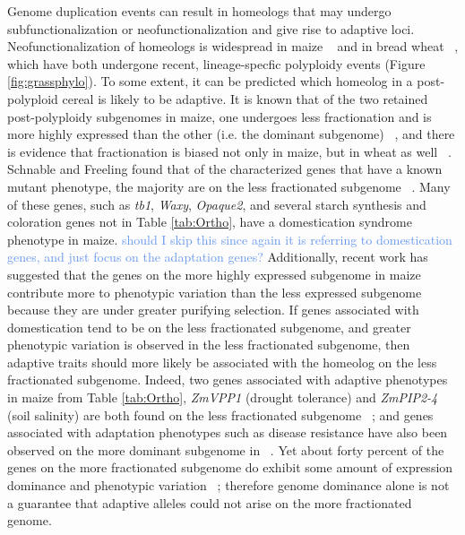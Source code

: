 \documentclass[12pt]{article}
\newcommand{\mbh}[1]{\textcolor{red}{\normalsize  #1}}
\newcommand{\mw}[1]{\textcolor{cornflowerblue}{\normalsize #1}}
\begin{document}

Genome duplication events can result in homeologs that may undergo subfunctionalization or neofunctionalization and give rise to adaptive loci. Neofunctionalization of homeologs is widespread in maize ~\citep{Hughes2014} and in bread wheat ~\citep{Pfeifer2014}, which have both undergone recent, lineage-specfic polyploidy events (Figure \ref{fig:grassphylo}).
To some extent, it can be predicted which homeolog in a post-polyploid cereal is likely to be adaptive.
It is known that of the two retained post-polyploidy subgenomes in maize, one undergoes less fractionation and is more highly expressed than the other (i.e. the dominant subgenome) ~\citep{Woodhouse2010, Schnable2011}, and there is evidence that fractionation is biased not only in maize, but in wheat as well ~\citep{Eckardt2014}.
Schnable and Freeling found that of the characterized genes that have a known mutant phenotype, the majority are on the less fractionated subgenome ~\citep{Schnable20112}.
Many of these genes, such as \textit{tb1}, \textit{Waxy}, \textit{Opaque2}, and several starch synthesis and coloration genes not in Table \ref{tab:Ortho}, have a domestication syndrome phenotype in maize. \mw{should I skip this since again it is referring to domestication genes, and just focus on the adaptation genes?}
Additionally, recent work has suggested that the genes on the more highly expressed subgenome in maize contribute more to phenotypic variation than the less expressed subgenome ~\citep{RennyByfield2017} because they are under greater purifying selection.
If genes associated with domestication tend to be on the less fractionated subgenome, and greater phenotypic variation is observed in the less fractionated subgenome, then adaptive traits should more likely be associated with the homeolog on the less fractionated subgenome.
Indeed, two genes associated with adaptive phenotypes in maize from Table \ref{tab:Ortho}, \textit{ZmVPP1} (drought tolerance) and \textit{ZmPIP2-4} (soil salinity) are both found on the less fractionated subgenome ~\citep{Schnable20112}; and genes associated with adaptation phenotypes such as disease resistance have also been observed on the more dominant subgenome in ~\citep{RennyByfield2017}. 
Yet about forty percent of the genes on the more fractionated subgenome do exhibit some amount of expression dominance and phenotypic variation ~\citep{RennyByfield2017}; therefore genome dominance alone is not a guarantee that adaptive alleles could not arise on the more fractionated genome.  
\end{document}
